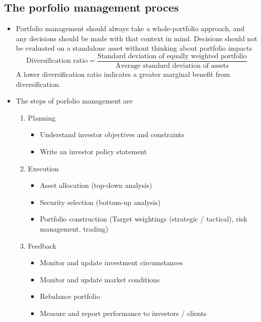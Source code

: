\documentclass[../notes_compiled.tex]{subfiles}
\begin{document}
\subsection{The porfolio management proces}
\begin{itemize}
\item Portfolio management should always take a whole-portfolio approach, and any decisions should be made with that context in mind. Decisions should not be evaluated on a standalone asset without thinking about portfolio impacts
\begin{equation}
\text{Diversification ratio} = \frac{\text{Standard deviation of equally weighted portfolio}}{\text{Average standard deviation of assets}}
\end{equation}
A lower diversification ratio indicates a greater marginal benefit from diversification.
\item The steps of porfolio management are
\begin{enumerate}
\item Planning
\begin{itemize}
\item Understand investor objectives and constraints
\item Write an investor policy statement
\end{itemize}
\item Execution
\begin{itemize}
\item Asset allocation (top-down analysis)
\item Security selection (bottom-up analysis)
\item Portfolio construction (Target weightings (strategic / tactical), risk management, trading)
\end{itemize}
\item Feedback
\begin{itemize}
\item Monitor and update investment circumstances
\item Monitor and update market conditions
\item Rebalance portfolio
\item Measure and report performance to investors / clients
\end{itemize}
\end{enumerate}
\end{itemize}
\end{document}

